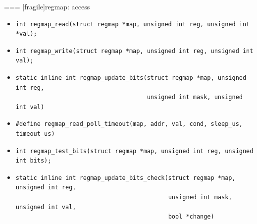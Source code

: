 === [fragile]{regmap: access}
  \begin{itemize}
    \fontsize{9}{9}\selectfont
    \item 
      \begin{block}{}
        \begin{verbatim}
int regmap_read(struct regmap *map, unsigned int reg, unsigned int *val);
        \end{verbatim}
      \end{block}
    \item 
      \begin{block}{}
        \begin{verbatim}
int regmap_write(struct regmap *map, unsigned int reg, unsigned int val);
        \end{verbatim}
      \end{block}
    \item 
      \begin{block}{}
        \begin{verbatim}
static inline int regmap_update_bits(struct regmap *map, unsigned int reg,
                                     unsigned int mask, unsigned int val)
        \end{verbatim}
      \end{block}
    \item 
      \begin{block}{}
        \begin{verbatim}
#define regmap_read_poll_timeout(map, addr, val, cond, sleep_us, timeout_us)
        \end{verbatim}
      \end{block}
    \item 
      \begin{block}{}
        \begin{verbatim}
int regmap_test_bits(struct regmap *map, unsigned int reg, unsigned int bits);
        \end{verbatim}
      \end{block}
    \item 
      \begin{block}{}
        \begin{verbatim}
static inline int regmap_update_bits_check(struct regmap *map, unsigned int reg,
                                           unsigned int mask, unsigned int val,
                                           bool *change)
        \end{verbatim}
      \end{block}
  \end{itemize}


